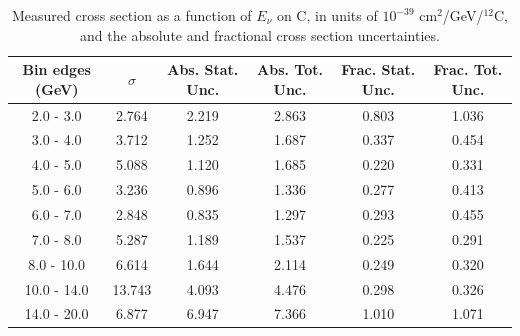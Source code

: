 \documentclass[aps,prl,twocolumn,superscriptaddress,nofootinbib]{revtex4-1}
\begin{document}
\begin{table}[h!]
  \centering
  \caption{Measured cross section as a function of $E_{\nu}$ on C, in units of
  $10^{-39}$ $\text{cm}^{2}$/GeV/$^{12}$C, and the absolute and
  fractional cross section uncertainties.}
    \begin{tabular}{c||c||c|c||c|c}
      Bin edges (GeV)  &  $\sigma$  &  Abs. Stat. Unc. & Abs. Tot. Unc.  &  Frac. Stat. Unc.  &  Frac. Tot. Unc. \\
      \hline\hline
        2.0 - 3.0 & 2.764 & 2.219 & 2.863 & 0.803 & 1.036 \\
        3.0 - 4.0 & 3.712 & 1.252 & 1.687 & 0.337 & 0.454 \\
        4.0 - 5.0 & 5.088 & 1.120 & 1.685 & 0.220 & 0.331 \\
        5.0 - 6.0 & 3.236 & 0.896 & 1.336 & 0.277 & 0.413 \\
        6.0 - 7.0 & 2.848 & 0.835 & 1.297 & 0.293 & 0.455 \\
        7.0 - 8.0 & 5.287 & 1.189 & 1.537 & 0.225 & 0.291 \\
       8.0 - 10.0 & 6.614 & 1.644 & 2.114 & 0.249 & 0.320 \\
      10.0 - 14.0 & 13.743 & 4.093 & 4.476 & 0.298 & 0.326 \\
      14.0 - 20.0 & 6.877 & 6.947 & 7.366 & 1.010 & 1.071 \\
    \end{tabular}
  \label{table:EnuXSec_C}
\end{table}
\end{document}
